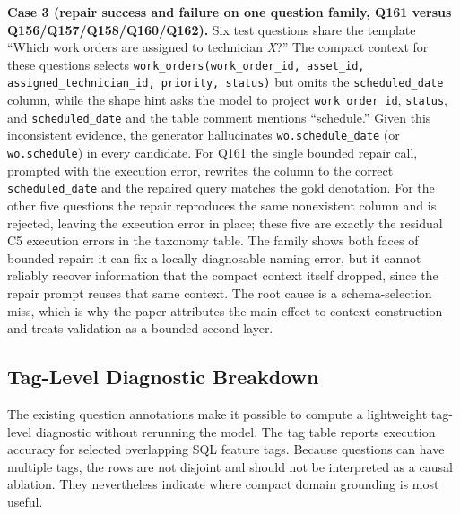 \documentclass{ieeeaccess}
\begin{document}
\textbf{Case 3 (repair success and failure on one question family, Q161 versus Q156/Q157/Q158/Q160/Q162).} Six test questions share the template ``Which work orders are assigned to technician \emph{X}?'' The compact context for these questions selects \texttt{work\_orders(work\_order\_id, asset\_id, assigned\_technician\_id, priority, status)} but omits the \texttt{scheduled\_date} column, while the shape hint asks the model to project \texttt{work\_order\_id}, \texttt{status}, and \texttt{scheduled\_date} and the table comment mentions ``schedule.'' Given this inconsistent evidence, the generator hallucinates \texttt{wo.schedule\_date} (or \texttt{wo.schedule}) in every candidate. For Q161 the single bounded repair call, prompted with the execution error, rewrites the column to the correct \texttt{scheduled\_date} and the repaired query matches the gold denotation. For the other five questions the repair reproduces the same nonexistent column and is rejected, leaving the execution error in place; these five are exactly the residual C5 execution errors in the taxonomy table. The family shows both faces of bounded repair: it can fix a locally diagnosable naming error, but it cannot reliably recover information that the compact context itself dropped, since the repair prompt reuses that same context. The root cause is a schema-selection miss, which is why the paper attributes the main effect to context construction and treats validation as a bounded second layer.

\subsection{Tag-Level Diagnostic Breakdown}\label{tag-level-diagnostic-breakdown}

The existing question annotations make it possible to compute a lightweight tag-level diagnostic without rerunning the model. The tag table reports execution accuracy for selected overlapping SQL feature tags. Because questions can have multiple tags, the rows are not disjoint and should not be interpreted as a causal ablation. They nevertheless indicate where compact domain grounding is most useful.
\end{document}
